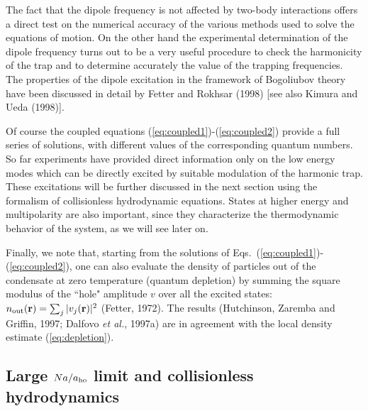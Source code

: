 The fact that the dipole frequency is not affected by two-body interactions 
offers a direct test on the numerical accuracy of the various methods 
used to solve the equations of motion.  On the other hand
the experimental determination of the dipole frequency turns out to
be a  very useful procedure to check the harmonicity of the
trap and  to determine accurately the value of the trapping frequencies.
The properties of the dipole excitation in the framework of Bogoliubov 
theory have been discussed in detail by Fetter and Rokhsar (1998) [see
also Kimura and Ueda (1998)]. 

Of course the coupled equations (\ref{eq:coupled1})-(\ref{eq:coupled2})
provide a full series of solutions, with different values of the
corresponding quantum numbers. So far experiments have provided
direct information only on the low energy modes which can  be
directly excited by suitable modulation of the harmonic trap. These
excitations will be further discussed in the next section using the
formalism of collisionless hydrodynamic equations. States at higher 
energy and multipolarity are also important, since they characterize 
the thermodynamic behavior of the system, as we will see later on.

Finally, we note that, starting from the solutions of 
Eqs.~(\ref{eq:coupled1})-(\ref{eq:coupled2}), one can also evaluate 
the density of particles out of the condensate at zero temperature 
(quantum  depletion) by summing the 
square modulus  of the ``hole" amplitude $v$ over all the 
excited states: $n_{\rm out}({\bf r}) = \sum_j |v_j({\bf r})|^2$ (Fetter, 
1972). The results (Hutchinson, Zaremba and Griffin, 1997; Dalfovo 
{\it et al.}, 1997a) are in agreement with the local density estimate 
(\ref{eq:depletion}).


\subsection{ Large $Na/a_{\rm ho}$ limit and collisionless hydrodynamics}
\label{sec:hydrodynamics}

